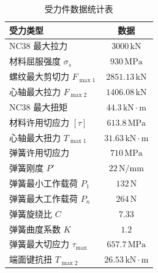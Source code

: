 \begin{table}[htbp]
    \centering
    \caption{受力件数据统计表}
    \label{tab:force_data_statistics}
    \renewcommand{\arraystretch}{1.3} %
    \begin{tabularx}{0.8\textwidth}{Xc}  %
        \toprule
        \textbf{受力类型} & \textbf{数据}\\
        \midrule
        NC38 最大拉力 & $3000\,\text{kN}$ \\
        材料屈服强度 $\sigma_s$ & $930\,\text{MPa}$ \\
        螺纹最大剪切力 $F_{\max1}$ & $2851.13\,\text{kN}$ \\
        心轴最大拉力 $F_{\max2}$ & $1406.08\,\text{kN}$ \\
        NC38 最大扭矩 & $44.3\,\text{kN}\cdot\text{m}$ \\
        材料许用切应力 $[\tau]$ & $613.8\,\text{MPa}$ \\
        心轴最大扭力 $T_{\max1}$ & $31.63\,\text{kN}\cdot\text{m}$ \\
        弹簧许用切应力 & $710\,\text{MPa}$ \\
        弹簧刚度 $P'$ & $22\,\text{N/mm}$ \\
        弹簧最小工作载荷 $P_1$ & $132\,\text{N}$ \\
        弹簧最大工作载荷 $P_n$ & $264\,\text{N}$ \\
        弹簧旋绕比 $C$ & $7.33$ \\
        弹簧曲度系数 $K$ & $1.2$ \\
        弹簧最大切应力 $\tau_{\max}$ & $657.7\,\text{MPa}$ \\
        端面键抗扭 $T_{\max2}$ & $26.53\,\text{kN}\cdot\text{m}$ \\
        \bottomrule
    \end{tabularx}
\end{table}